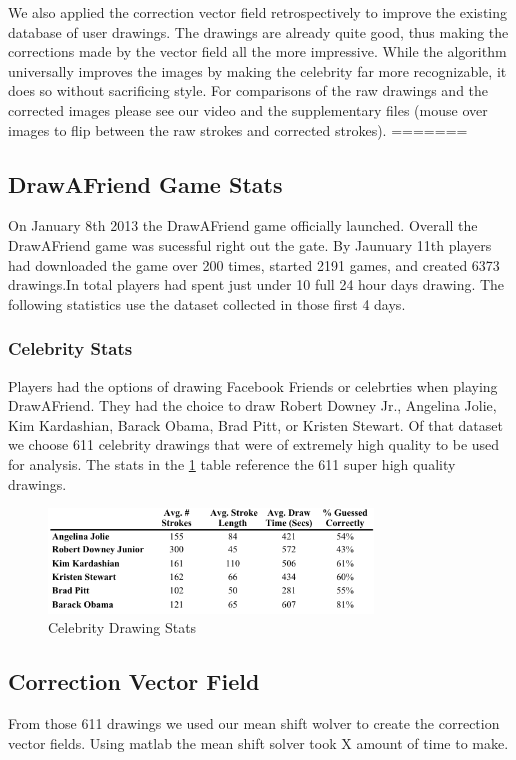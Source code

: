 
We also applied the correction vector field retrospectively to improve the existing database of user drawings. The drawings are already quite good, thus making the corrections made by the vector field all the more impressive.  While the algorithm universally improves the images by making the celebrity far more recognizable, it does so without sacrificing style. For comparisons of the raw drawings and the corrected images please see our video and the supplementary files (mouse over images to flip between the raw strokes and corrected strokes).
=======
\subsection{DrawAFriend Game Stats}
On January 8th 2013 the DrawAFriend game officially launched. Overall the DrawAFriend game was sucessful right out the gate. By Jaunuary 11th players had downloaded the game over 200 times, started 2191 games, and created 6373 drawings.In total players had spent just under 10 full 24 hour days drawing. The following statistics use the dataset collected in those first 4 days. 

\subsubsection{Celebrity Stats}
Players had the options of drawing Facebook Friends or celebrties when playing DrawAFriend. They had the choice to draw Robert Downey Jr., Angelina Jolie, Kim Kardashian, Barack Obama, Brad Pitt, or Kristen Stewart.  Of that dataset we choose 611 celebrity drawings that were of extremely high quality to be used for analysis. The stats in the \ref{fig:daf-stats} table reference the 611 super high quality drawings.

\begin{figure}[b]
  \centering%
\includegraphics[height=1.1in]{./figures/daf-stats-cropped.pdf}
  \caption{Celebrity Drawing Stats}
  \label{fig:daf-stats}
\end{figure}

\subsection {Correction Vector Field}
From those 611 drawings we used our mean shift wolver to create the correction vector fields. Using matlab the mean shift solver took X amount of time to make. 

